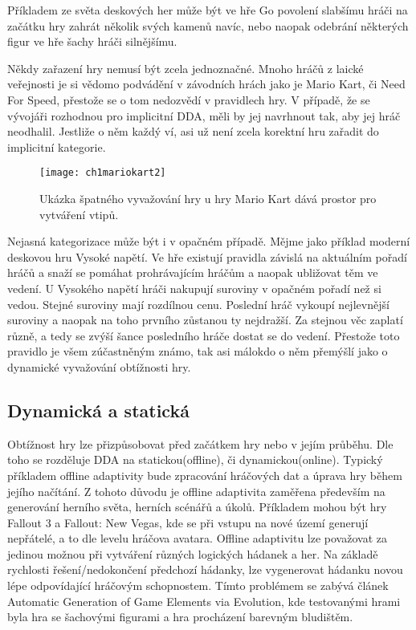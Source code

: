 Příkladem ze světa deskových her může být ve hře Go povolení slabšímu hráči na začátku hry zahrát několik svých kamenů navíc, nebo naopak odebrání některých figur ve hře šachy hráči silnějšímu.

Někdy zařazení hry nemusí být zcela jednoznačné. Mnoho hráčů z laické veřejnosti je si vědomo podvádění v závodních hrách jako je Mario Kart, či Need For Speed, přestože se o tom nedozvědí v pravidlech hry. V případě, že se vývojáři rozhodnou pro implicitní DDA, měli by jej navrhnout tak, aby jej hráč neodhalil. Jestliže o něm každý ví, asi už není zcela korektní hru zařadit do implicitní kategorie.

\begin{figure}
  \centering
  \texttt{[image: ch1mariokart2]}
	\caption{Ukázka špatného vyvažování hry u hry Mario Kart dává prostor pro vytváření vtipů. \cite{15UnTrue} }
	\label{ch1mariokart2}
\end{figure}

Nejasná kategorizace může být i v opačném případě. Mějme jako příklad moderní deskovou hru Vysoké napětí. Ve hře existují pravidla závislá na aktuálním pořadí hráčů a snaží se pomáhat prohrávajícím hráčům a naopak ubližovat těm ve vedení. U Vysokého napětí hráči nakupují suroviny v opačném pořadí než si vedou. Stejné suroviny mají rozdílnou cenu. Poslední hráč vykoupí nejlevnější suroviny a naopak na toho prvního zůstanou ty nejdražší. Za stejnou věc zaplatí různě, a tedy se zvýší šance posledního hráče dostat se do vedení. Přestože toto pravidlo je všem zúčastněným známo, tak asi málokdo o něm přemýšlí jako o dynamické vyvažování obtížnosti hry.

\subsection{Dynamická a statická}

Obtížnost hry lze přizpůsobovat před začátkem hry nebo v jejím průběhu. Dle toho se rozděluje DDA na statickou(offline), či dynamickou(online). Typický příkladem offline adaptivity bude zpracování hráčových dat a úprava hry během jejího načítání. Z tohoto důvodu je offline adaptivita zaměřena především na generování herního světa, herních scénářů a úkolů\cite{16Survey}. Příkladem mohou být hry Fallout 3 a Fallout: New Vegas, kde se při vstupu na nové území generují nepřátelé, a to dle levelu hráčova avatara. Offline adaptivitu lze považovat za jedinou možnou při vytváření různých logických hádanek a her. Na základě rychlosti řešení/nedokončení předchozí hádanky, lze vygenerovat hádanku novou lépe odpovídající hráčovým schopnostem. Tímto problémem se zabývá článek Automatic Generation of Game Elements via Evolution\cite{17Evol}, kde testovanými hrami byla hra se šachovými figurami a hra procházení barevným bludištěm.

